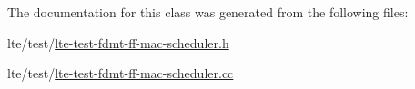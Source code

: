 The documentation for this class was generated from the following files\+:\begin{DoxyCompactItemize}
\item 
lte/test/\hyperlink{lte-test-fdmt-ff-mac-scheduler_8h}{lte-\/test-\/fdmt-\/ff-\/mac-\/scheduler.\+h}\item 
lte/test/\hyperlink{lte-test-fdmt-ff-mac-scheduler_8cc}{lte-\/test-\/fdmt-\/ff-\/mac-\/scheduler.\+cc}\end{DoxyCompactItemize}
